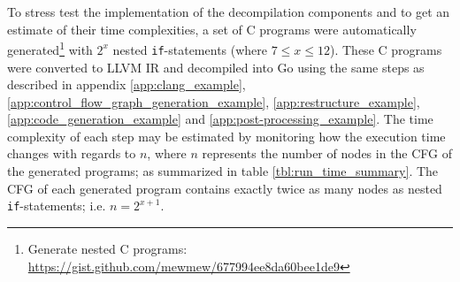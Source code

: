 To stress test the implementation of the decompilation components and to get an estimate of their time complexities, a set of C programs were automatically generated\footnote{Generate nested C programs: \url{https://gist.github.com/mewmew/677994ee8da60bee1de9}} with $ 2^{x} $ nested \texttt{if}-statements (where $ 7 \le x \le 12 $). These C programs were converted to LLVM IR and decompiled into Go using the same steps as described in appendix \ref{app:clang_example}, \ref{app:control_flow_graph_generation_example}, \ref{app:restructure_example}, \ref{app:code_generation_example} and \ref{app:post-processing_example}. The time complexity of each step may be estimated by monitoring how the execution time changes with regards to $ n $, where $ n $ represents the number of nodes in the CFG of the generated programs; as summarized in table \ref{tbl:run_time_summary}. The CFG of each generated program contains exactly twice as many nodes as nested \texttt{if}-statements; i.e. $ n = 2^{x+1} $.


